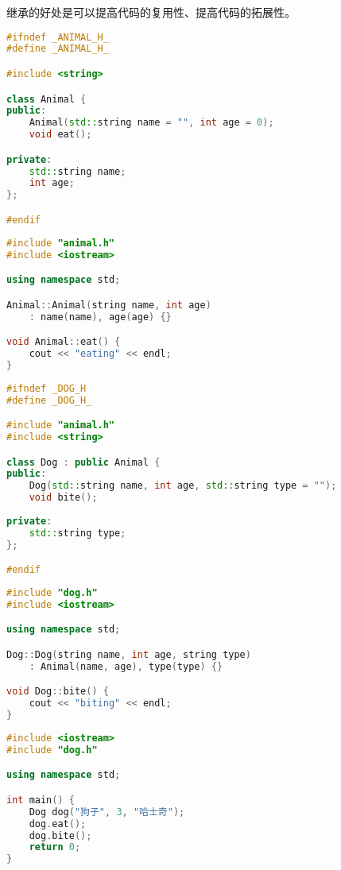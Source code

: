 继承的好处是可以提高代码的复用性、提高代码的拓展性。 \\


\begin{lstlisting}[language=C++, title=animal.h]
#ifndef _ANIMAL_H_
#define _ANIMAL_H_

#include <string>

class Animal {
public:
    Animal(std::string name = "", int age = 0);
    void eat();

private:
    std::string name;
    int age;
};

#endif
\end{lstlisting}

\begin{lstlisting}[language=C++, title=animal.cpp]
#include "animal.h"
#include <iostream>

using namespace std;

Animal::Animal(string name, int age)
    : name(name), age(age) {}

void Animal::eat() {
    cout << "eating" << endl;
}
\end{lstlisting}

\begin{lstlisting}[language=C++, title=dog.h]
#ifndef _DOG_H
#define _DOG_H_

#include "animal.h"
#include <string>

class Dog : public Animal {
public:
    Dog(std::string name, int age, std::string type = "");
    void bite();
    
private:
    std::string type;
};

#endif
\end{lstlisting}

\begin{lstlisting}[language=C++, title=dog.cpp]
#include "dog.h"
#include <iostream>

using namespace std;

Dog::Dog(string name, int age, string type)
    : Animal(name, age), type(type) {}

void Dog::bite() {
    cout << "biting" << endl;
}
\end{lstlisting}

\begin{lstlisting}[language=C++, title=test\_dog.cpp]
#include <iostream>
#include "dog.h"

using namespace std;

int main() {
    Dog dog("狗子", 3, "哈士奇");
    dog.eat();
    dog.bite();
    return 0;
}
\end{lstlisting}

